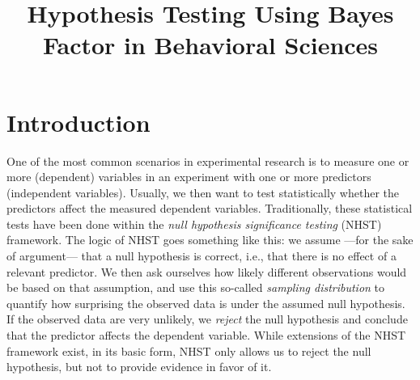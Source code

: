 \documentclass[
  doc,
  floatsintext,
  longtable,
  nolmodern,
  notxfonts,
  notimes,
  colorlinks=true,linkcolor=blue,citecolor=blue,urlcolor=blue]{apa7}
\title{Hypothesis Testing Using Bayes Factor in Behavioral Sciences}
\begin{document}
\maketitle



\setcounter{secnumdepth}{3}

\setlength\LTleft{0pt}




\section{Introduction}\label{introduction}

One of the most common scenarios in experimental research is to measure
one or more (dependent) variables in an experiment with one or more
predictors (independent variables). Usually, we then want to test
statistically whether the predictors affect the measured dependent
variables. Traditionally, these statistical tests have been done within
the \emph{null hypothesis significance testing} (NHST) framework. The
logic of NHST goes something like this: we assume ---for the sake of
argument--- that a null hypothesis is correct, i.e., that there is no
effect of a relevant predictor. We then ask ourselves how likely
different observations would be based on that assumption, and use this
so-called \emph{sampling distribution} to quantify how surprising the
observed data is under the assumed null hypothesis. If the observed data
are very unlikely, we \emph{reject} the null hypothesis and conclude
that the predictor affects the dependent variable. While extensions of
the NHST framework exist, in its basic form, NHST only allows us to
reject the null hypothesis, but not to provide evidence in favor of it.
\end{document}
